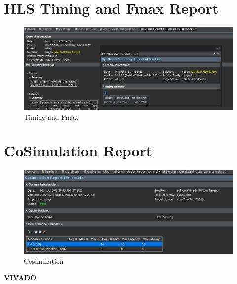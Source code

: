 \documentclass{article}
\begin{document}
\section{HLS Timing and Fmax Report}
\vspace{1cm}
\begin{figure}[h]
    \centering
\includegraphics[width=1.4\textwidth]{figs/p12.png}
    \caption{Timing and Fmax}
    \label{fig:my_label}
\end{figure}

\vspace{15cm}


\section{CoSimulation Report}
\vspace{1cm}
\begin{figure}[h]
    \centering
\includegraphics[width=1.4\textwidth]{figs/p13.png}
    \caption{Cosimulation}
    \label{fig:my_label}
\end{figure}

\vspace{15cm}


\maketitle
\hfill \textbf{VIVADO}
\end{document}

